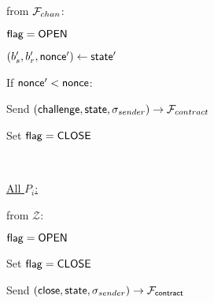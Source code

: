 \begin{bbox}[title={$\Pi_{\msf{pay}} (P_s, P_r, b_s, b_r)$}]
\OnInput {} from $\mathcal{F}_{chan}$:
	\begin{renumerate}
		\item \Require ${\mathsf {flag}} = {\mathsf {OPEN}}$
		\item $(b_s', b_r', {\mathsf {nonce}}') \leftarrow {\mathsf {state}}'$
		\item If ${\mathsf {nonce}}' < {\mathsf {nonce}}$:

			\quad Send $({\mathsf {challenge}}, {\mathsf {state}}, \sigma_{sender}) \rightarrow \mathcal{F}_{contract}$

		\item Set ${\mathsf {flag}} = {\mathsf {CLOSE}}$
	\end{renumerate}

\

\underline{All $P_i$:}

\OnInput {} from $\mathcal{Z}$:
	\begin{renumerate}
		\item \Require ${\mathsf {flag}} = {\mathsf {OPEN}}$
		\item Set ${\mathsf {flag}} = {\mathsf {CLOSE}}$
		\item Send $({\mathsf {close}}, {\mathsf {state}}, \sigma_{sender}) \rightarrow \mathcal{F}_{{\mathsf {contract}}}$
	\end{renumerate}

\end{bbox}
